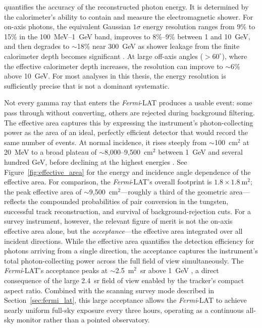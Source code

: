 \EDISP quantifies the accuracy of the reconstructed photon energy.
It is determined by the calorimeter's ability to contain and measure the electromagnetic shower.
For on-axis photons, the equivalent Gaussian $1\sigma$ energy resolution ranges from 9\% to 15\% in the 100~MeV--1~GeV band, improves to 8\%--9\% between 1 and 10~GeV, and then degrades to $\sim$18\% near 300~GeV as shower leakage from the finite calorimeter depth becomes significant \cite{Atwood:2009ez}.
At large off-axis angles ($>60^\circ$), where the effective calorimeter depth increases, the resolution can improve to $\sim$6\% above 10~GeV.
For most analyses in this thesis, the energy resolution is sufficiently precise that \EDISP is not a dominant systematic.

Not every gamma ray that enters the \textit{Fermi}-LAT produces a usable event: some pass through without converting, others are rejected during background filtering.
The effective area captures this by expressing the instrument's photon-collecting power as the area of an ideal, perfectly efficient detector that would record the same number of events.
At normal incidence, it rises steeply from $\sim$100~cm$^2$ at 20~MeV to a broad plateau of $\sim$8,000--9,500~cm$^2$ between 1~GeV and several hundred GeV, before declining at the highest energies \cite{Atwood:2009ez}. See Figure~\ref{fig:effective_area} for the energy and incidence angle dependence of the effective area.
For comparison, the \textit{Fermi}-LAT's overall footprint is $1.8 \times 1.8~\mathrm{m}^2$; the peak effective area of $\sim$9,500~cm$^2$---roughly a third of the geometric area---reflects the compounded probabilities of pair conversion in the tungsten, successful track reconstruction, and survival of background-rejection cuts.
For a survey instrument, however, the relevant figure of merit is not the on-axis effective area alone, but the \emph{acceptance}---the effective area integrated over all incident directions.
While the effective area quantifies the detection efficiency for photons arriving from a single direction, the acceptance captures the instrument's total photon-collecting power across the full field of view simultaneously.
The \textit{Fermi}-LAT's acceptance peaks at $\sim$2.5~m$^2$~sr above 1~GeV \cite{Atwood:2009ez}, a direct consequence of the large 2.4~sr field of view enabled by the tracker's compact aspect ratio.
Combined with the scanning survey mode described in Section~\ref{sec:fermi_lat}, this large acceptance allows the \textit{Fermi}-LAT to achieve nearly uniform full-sky exposure every three hours, operating as a continuous all-sky monitor rather than a pointed observatory.


